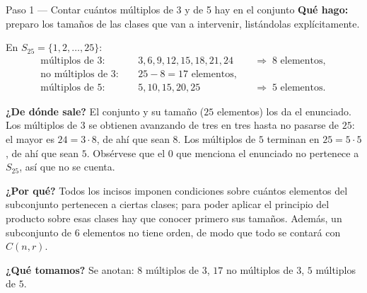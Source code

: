 \documentclass[11pt]{article}
\begin{document}
\begin{paso}{Paso 1 --- Contar cuántos múltiplos de 3 y de 5 hay en el conjunto}
\textbf{Qué hago:} preparo los tamaños de las clases que van a intervenir, listándolas explícitamente.

En $S_{25}=\{1,2,\dots,25\}$:
\begin{align*}
  \text{múltiplos de }3:&\quad 3,6,9,12,15,18,21,24 &&\Rightarrow\; 8 \text{ elementos},\\
  \text{no múltiplos de }3:&\quad 25-8 = 17 \text{ elementos},\\
  \text{múltiplos de }5:&\quad 5,10,15,20,25 &&\Rightarrow\; 5 \text{ elementos}.
\end{align*}

\textbf{¿De dónde sale?} El conjunto y su tamaño ($25$ elementos) los da el enunciado. Los múltiplos de $3$ se obtienen avanzando de tres en tres hasta no pasarse de $25$: el mayor es $24=3\cdot 8$, de ahí que sean $8$. Los múltiplos de $5$ terminan en $25=5\cdot 5$, de ahí que sean $5$. Obsérvese que el $0$ que menciona el enunciado no pertenece a $S_{25}$, así que no se cuenta.

\textbf{¿Por qué?} Todos los incisos imponen condiciones sobre cuántos elementos del subconjunto pertenecen a ciertas clases; para poder aplicar el principio del producto sobre esas clases hay que conocer primero sus tamaños. Además, un subconjunto de $6$ elementos no tiene orden, de modo que todo se contará con $C(n,r)$.

\textbf{¿Qué tomamos?} Se anotan: $8$ múltiplos de $3$, $17$ no múltiplos de $3$, $5$ múltiplos de $5$.
\end{paso}
\end{document}
